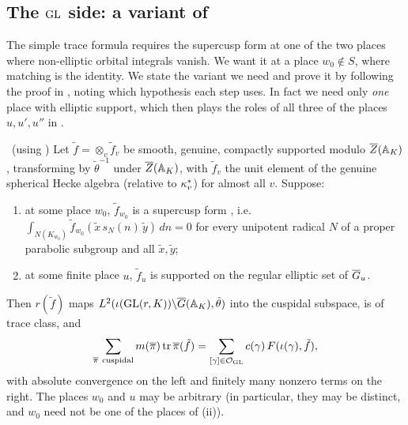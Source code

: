 \subsection{The $\mathrm{GL}$ side: a variant of \cite[\S18]{FK86}}\label{I:subsec:TFGL}
The simple trace formula \cite[\S18, Theorem]{FK86} requires the supercusp form at one of the two places where non-elliptic orbital integrals vanish. We want it at a place $w_0\notin S$, where matching is the identity. We state the variant we need and prove it by following the proof in \cite[\S18]{FK86}, noting which hypothesis each step uses. In fact we need only \emph{one} place with elliptic support, which then plays the roles of all three of the places $u,u',u''$ in \cite{FK86}.

\begin{proposition}\label{I:prop:FKvariant}\ (using \Ev)
Let $\tilde f=\otimes_v\tilde f_v$ be smooth, genuine, compactly supported modulo $\overline{Z}(\mathbb{A}_K)$, transforming by $\tilde\theta^{-1}$ under $\overline{Z}(\mathbb{A}_K)$, with $\tilde f_v$ the unit element of the genuine spherical Hecke algebra (relative to $\kappa^{*}_v$) for almost all $v$. Suppose:
\begin{enumerate}[label=(\roman*)]
\item at some place $w_0$, $\tilde f_{w_0}$ is a supercusp form \cite[\S13]{FK86}, i.e.\ $\int_{N(K_{w_0})}\tilde f_{w_0}(\tilde x\,s_N(n)\,\tilde y)\,dn=0$ for every unipotent radical $N$ of a proper parabolic subgroup and all $\tilde x,\tilde y$;
\item at some finite place $u$, $\tilde f_u$ is supported on the regular elliptic set of $\overline{G}_u$.
\end{enumerate}
Then $r(\tilde f)$ maps $L^2(\iota(\mathrm{GL}(r,K))\backslash\overline{G}(\mathbb{A}_K),\tilde\theta)$ into the cuspidal subspace, is of trace class, and
\[ \sum_{\pib\ \mathrm{cuspidal}}m(\pib)\tr\pib(\tilde f)=\sum_{[\gamma]\in\mathcal O_{\GL}}c(\gamma)\,F(\iota(\gamma),\tilde f), \]
with absolute convergence on the left and finitely many nonzero terms on the right. The places $w_0$ and $u$ may be arbitrary (in particular, they may be distinct, and $w_0$ need not be one of the places of (ii)).
\end{proposition}

